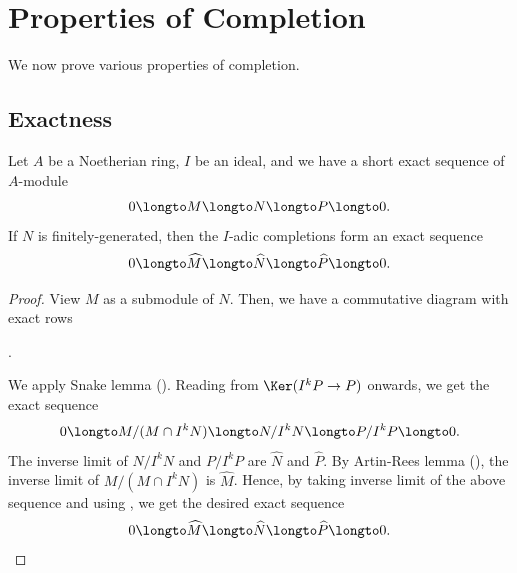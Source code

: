 \section{Properties of Completion}
We now prove various properties of completion.
\subsection{Exactness}
\begin{theorem}
\label{thm:completion_is_exact}
Let $A$ be a Noetherian ring, $I$ be an ideal,
and we have a short exact sequence of $A$-module
$$0\longto M\longto N\longto P\longto 0.$$
If $N$ is finitely-generated, then the $I$-adic completions
form an exact sequence
$$0\longto \widehat M\longto \widehat N\longto\widehat P\longto 0.$$
\end{theorem}
\begin{proof}
    View $M$ as a submodule of $N$.
    Then, we have a commutative diagram with exact rows
    \begin{center}
    .
    \end{center}
    We apply Snake lemma ().
    Reading from $\Ker(I^kP\to P)$ onwards,
    we get the exact sequence
    $$0\longto M/(M\cap I^kN) 
    \longto N/I^kN \longto P/I^k P \longto 0.$$
    The inverse limit of $N/I^kN$ and $P/I^kP$
    are $\widehat N$ and $\widehat P$.
    By Artin-Rees lemma (),
    the inverse limit of $M/(M\cap I^kN)$ is $\widehat M$.
    Hence, by taking inverse limit of the above sequence
    and using ,
    we get the desired exact sequence
    \[0\longto \widehat M\longto\widehat N
    \longto\widehat P\longto 0. \qedhere\]
\end{proof}
